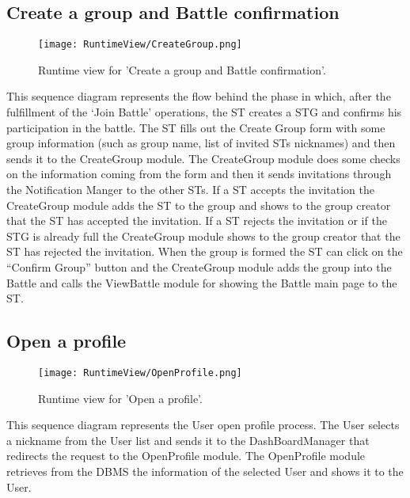 \subsection{Create a group and Battle confirmation}
\begin{figure}[H]
    \begin{center}
        \texttt{[image: RuntimeView/CreateGroup.png]}
        \caption{Runtime view for 'Create a group and Battle confirmation'.}
        \label{fig:runtime_creategroup}%
    \end{center}
\end{figure}
This sequence diagram represents the flow behind the phase in which, after the fulfillment of the ‘Join Battle’ operations, the ST creates a STG and confirms his participation in the battle.
The ST fills out the Create Group form with some group information (such as group name, list of invited STs nicknames) and then sends it to the CreateGroup module.
The CreateGroup module does some checks on the information coming from the form and then it sends invitations through the Notification Manger to the other STs. If a ST accepts the invitation the CreateGroup module adds the ST to the group and shows to the group creator that the ST has accepted the invitation. If a ST rejects the invitation or if the STG is already full the CreateGroup module shows to the group creator that the ST has rejected the invitation. When the group is formed the ST can click on the “Confirm Group” button and the CreateGroup module adds the group into the Battle and calls the ViewBattle module for showing the Battle main page to the ST.


\subsection{Open a profile}
\begin{figure}[H]
    \begin{center}
        \texttt{[image: RuntimeView/OpenProfile.png]}
        \caption{Runtime view for 'Open a profile'.}
        \label{fig:runtime_openprofile}%
    \end{center}
\end{figure}
This sequence diagram represents the User open profile process.
The User selects a nickname from the User list and sends it to the DashBoardManager that redirects the request to the OpenProfile module.
The OpenProfile module retrieves from the DBMS the information of the selected User and shows it to the User.


